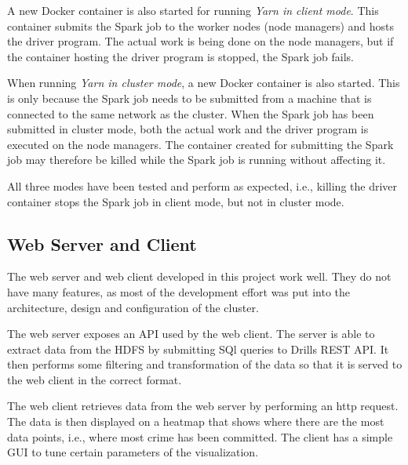 \documentclass[main.tex]{subfiles}
\begin{document}
A new Docker container is also started for running \textit{Yarn in client mode}. This container submits the Spark job to the worker nodes (node managers) and hosts the driver program. The actual work is being done on the node managers, but if the container hosting the driver program is stopped, the Spark job fails.

When running \textit{Yarn in cluster mode}, a new Docker container is also started. This is only because the Spark job needs to be submitted from a machine that is connected to the same network as the cluster. When the Spark job has been submitted in cluster mode, both the actual work and the driver program is executed on the node managers. The container created for submitting the Spark job may therefore be killed while the Spark job is running without affecting it.

All three modes have been tested and perform as expected, i.e., killing the driver container stops the Spark job in client mode, but not in cluster mode.


\subsection{Web Server and Client}
The web server and web client developed in this project work well. They do not have many features, as most of the development effort was put into the architecture, design and configuration of the cluster. 

The web server exposes an API used by the web client. The server is able to extract data from the HDFS by submitting SQl queries to Drills REST API. It then performs some filtering and transformation of the data so that it is served to the web client in the correct format.

The web client retrieves data from the web server by performing an http request. The data is then displayed on a heatmap that shows where there are the most data points, i.e., where most crime has been committed. The client has a simple GUI to tune certain parameters of the visualization. 
\end{document}
